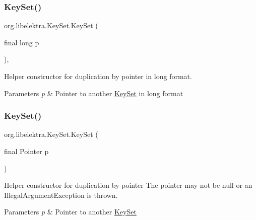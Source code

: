 \subsubsection{\texorpdfstring{KeySet()}{KeySet()}\hspace{0.1cm}{\footnotesize\ttfamily [1/2]}}
{\footnotesize\ttfamily org.\+libelektra.\+Key\+Set.\+Key\+Set (\begin{DoxyParamCaption}\item[{final long}]{p }\end{DoxyParamCaption})\hspace{0.3cm}{\ttfamily [inline]}, {\ttfamily [protected]}}



Helper constructor for duplication by pointer in long format. 


\begin{DoxyParams}{Parameters}
{\em p} & Pointer to another \mbox{\hyperlink{classorg_1_1libelektra_1_1KeySet}{Key\+Set}} in long format \\
\hline
\end{DoxyParams}
\mbox{\label{classorg_1_1libelektra_1_1KeySet_adf4ea02b31ed468e49c615f61ea57a15}} 
\subsubsection{\texorpdfstring{KeySet()}{KeySet()}\hspace{0.1cm}{\footnotesize\ttfamily [2/2]}}
{\footnotesize\ttfamily org.\+libelektra.\+Key\+Set.\+Key\+Set (\begin{DoxyParamCaption}\item[{final Pointer}]{p }\end{DoxyParamCaption})\hspace{0.3cm}{\ttfamily [inline]}}



Helper constructor for duplication by pointer The pointer may not be null or an Illegal\+Argument\+Exception is thrown. 


\begin{DoxyParams}{Parameters}
{\em p} & Pointer to another \mbox{\hyperlink{classorg_1_1libelektra_1_1KeySet}{Key\+Set}} \\
\hline
\end{DoxyParams}


